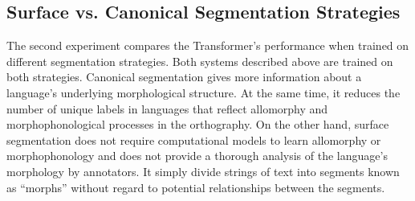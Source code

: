 


\subsection{Surface vs. Canonical Segmentation Strategies}
\label{sec:strategies}

The second experiment compares the Transformer's performance when trained on different segmentation strategies. Both systems described above are trained on both strategies. Canonical segmentation gives more information about a language's underlying morphological structure. At the same time, it reduces the number of unique labels in languages that reflect allomorphy and morphophonological processes in the orthography. On the other hand, surface segmentation does not require computational models to learn allomorphy or morphophonology \citep{goldsmith_computational_2017} and does not provide a thorough analysis of the language's morphology by annotators. It simply divide strings of text into segments known as ``morphs'' \citep{virpioja_empirical_2011} without regard to potential relationships between the segments. 

